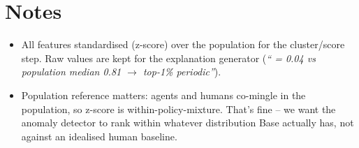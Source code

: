 \documentclass[11pt]{article}
\begin{document}
\section{Notes}

\begin{itemize}
  \item All features standardised (z-score) over the population for the
    cluster/score step. Raw values are kept for the explanation generator
    (\textit{`` = 0.04 vs population median 0.81
    $\to$ top-1\% periodic''}).
  \item Population reference matters: agents and humans co-mingle in the
    population, so z-score is within-policy-mixture. That's fine -- we
    want the anomaly detector to rank within whatever distribution Base
    actually has, not against an idealised human baseline.
\end{itemize}
\end{document}
